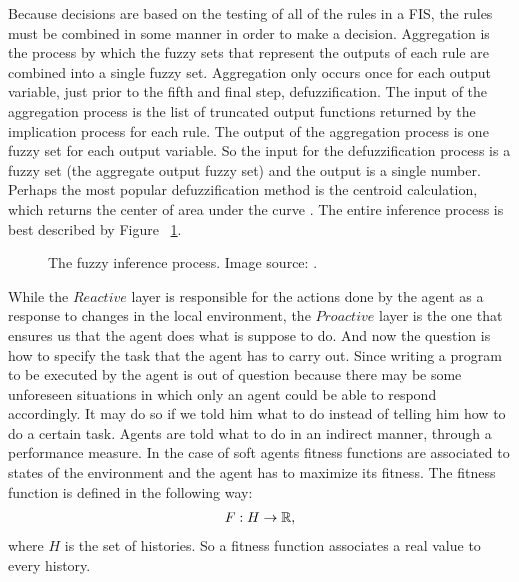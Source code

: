 Because decisions are based on the testing of all of the rules in a FIS, the rules must be combined in some manner in order to make a decision. Aggregation is the process by which the fuzzy sets that represent the outputs of each rule are combined into a single fuzzy set. Aggregation only occurs once for each output variable, just prior to the fifth and final step, defuzzification. The input of the aggregation process is the list of truncated output functions returned by the implication process for each rule. The output of the aggregation process is one fuzzy set for each output variable. So the input for the defuzzification process is a fuzzy set (the aggregate output fuzzy set) and the output is a single number. Perhaps the most popular defuzzification method is the centroid calculation, which returns the center of area under the curve \cite{website:fuzzyinference}. The entire inference process is best described by Figure ~\ref{fig:fuzzyinference}.
\begin{figure}[h!]
\centerline{}
      \caption[Fuzzy inference process.]{The fuzzy inference process. Image source:  \cite{website:fuzzyinference}.}
\label{fig:fuzzyinference}
\end{figure}


While the $Reactive$ layer is responsible for the actions done by the agent as a response to changes in the local environment, the $Proactive$ layer is the one that ensures us that the agent does what is suppose to do. And now the question is how to specify the task that the agent has to carry out. Since writing a program to be executed by the agent is out of question because there may be some unforeseen situations in which only an agent could be able to respond accordingly. It may do so if we told him what to do instead of telling him how to do a certain task. Agents are told what to do in an indirect manner, through a performance measure. In the case of soft agents fitness functions are associated to states of the environment and the agent has to maximize its fitness. The fitness function is defined in the following way:
\begin{align}
F: H \rightarrow \mathbb R ,
\end{align}
where $H$ is the set of histories. So a fitness function associates a real value to every history.

